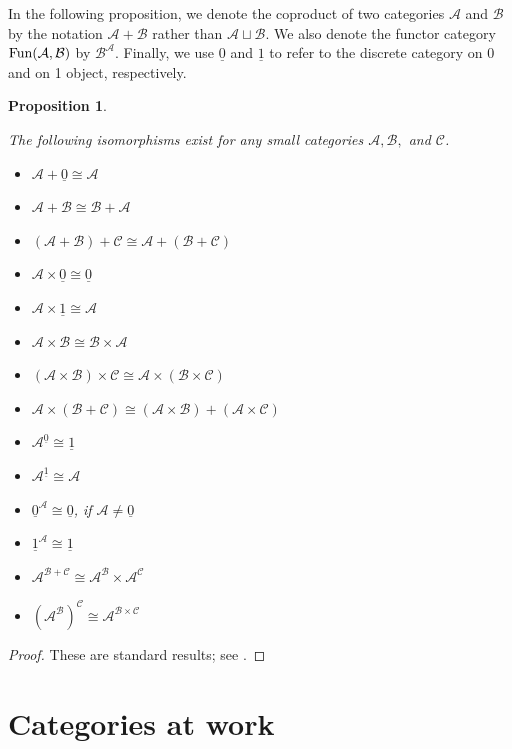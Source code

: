 \documentclass{book}
\def\tn{\textnormal}
\def\mc{\mathcal}
\def\Fun{\tn{Fun}}
\def\iso{\cong}
\def\ul{\underline}
\def\mcA{\mc{A}}
\def\mcB{\mc{B}}
\def\mcC{\mc{C}}
\newtheorem{proposition}[subsubsection]{Proposition}
\theoremstyle{remark}
\theoremstyle{definition}
\begin{document}
In the following proposition, we denote the coproduct of two categories $\mcA$ and $\mcB$ by the notation $\mcA+\mcB$ rather than $\mcA\sqcup\mcB$. We also denote the functor category $\Fun(\mcA,\mcB)$ by $\mcB^\mcA$. Finally, we use $\ul{0}$ and $\ul{1}$ to refer to the discrete category on 0 and on 1 object, respectively.

\begin{proposition}\label{prop:arithmetic of cats}

The following isomorphisms exist for any small categories $\mcA,\mcB,$ and $\mcC$.

\begin{itemize}
\item $\mcA+\ul{0}\iso \mcA$
\item $\mcA + \mcB\iso \mcB + \mcA$
\item $(\mcA + \mcB) + \mcC \iso \mcA + (\mcB + \mcC)$
\item $\mcA\times\ul{0}\iso\ul{0}$
\item $\mcA\times\ul{1}\iso \mcA$
\item $\mcA\times \mcB\iso \mcB\times \mcA$
\item $(\mcA\times\mcB)\times\mcC\iso\mcA\times(\mcB\times\mcC)$
\item $\mcA\times(\mcB+\mcC)\iso (\mcA\times \mcB)+(\mcA\times \mcC)$
\item $\mcA^{\ul{0}}\iso \ul{1}$
\item $\mcA^{\ul{1}}\iso \mcA$
\item $\ul{0}^\mcA\iso\ul{0}$,\;\; if $\mcA\neq\ul{0}$
\item $\ul{1}^\mcA\iso\ul{1}$
\item $\mcA^{\mcB+\mcC}\iso \mcA^\mcB\times \mcA^\mcC$
\item $(\mcA^\mcB)^\mcC\iso \mcA^{\mcB\times \mcC}$
\end{itemize}

\end{proposition}

\begin{proof}

These are standard results; see \cite{Mac}.

\end{proof}


\chapter{Categories at work}
\end{document}
